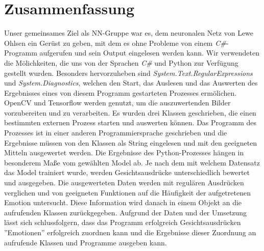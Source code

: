 \documentclass[12pt,a4paper,headinclude,twoside, plainheadsepline, open=right,numbers=noenddot]{scrreprt}
\begin{document}
\section{Zusammenfassung}
Unser gemeinsames Ziel als NN-Gruppe war es, dem neuronalen Netz von Lewe Ohlsen ein Ger\"{u}st zu geben, mit dem es ohne Probleme von einem \textit{C\#}-Programm aufgerufen und sein Output eingelesen werden kann.%
Wir verwendeten die M\"{o}lichkeiten, die uns von der Sprachen \textit{C\#} und Python zur Verf\"{u}gung gestellt wurden. Besonders hervorzuheben sind \textit{System.Text.RegularExpressions} und \textit{System.Diagnostics}, welchen den Start, das Auslesen und das Auswerten des Ergebnisses eines von diesem Programm gestarteten Prozesses erm\"{o}lichen. OpenCV und Tensorflow werden genutzt, um die auszuwertenden Bilder vorzubereiten und zu verarbeiten.%
Es wurden drei Klassen geschrieben, die einen bestimmten externen Prozess starten und auswerten k\"{o}nnen. Das Programm des Prozesses ist in einer anderen Programmiersprache geschrieben und die Ergebnisse m\"{u}ssen von den Klassen als String eingelesen und mit den geeigneten Mitteln ausgewertet werden. Die Ergebnisse des Python-Prozesses h\"{a}ngen in besonderem Ma{\ss}e vom gew\"{a}hlten Model ab. Je nach dem mit welchem Datensatz das Model trainiert wurde, werden Gesichtsausdr\"{u}cke unterschiedlich bewertet und ausgegeben. %
Die ausgewerteten Daten werden mit regul\"{a}ren Ausdr\"{u}cken verglichen und von geeigneten Funktionen auf die H\"{a}ufigkeit der aufgetretenen Emotion untersucht. Diese Information wird danach in einem Objekt an die aufrufenden Klassen zur\"{u}ckgegeben.%
\newline
Aufgrund der Daten und der Umsetzung l\"{a}sst sich schlussfolgern, dass das Programm erfolgreich Gesichtsausdr\"{u}cken ''Emotionen'' erfolgreich zuordnen kann und die Ergebnisse dieser Zuordnung an aufrufende Klassen und Programme ausgeben kann.
 




\printbibliography


\appendix

 
\end{document}
